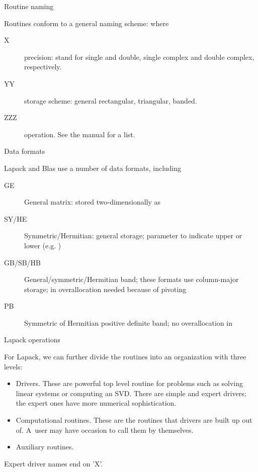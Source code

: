 {Routine naming}

Routines conform to a general naming scheme:  where
\begin{description}
\item[X] precision:  stand for single and double, single
  complex and double complex, respectively.
\item[YY] storage scheme: general rectangular, triangular, banded.
\item[ZZZ] operation. See the manual for a list.
\end{description}

 {Data formats}

Lapack and Blas use a number of data formats, including
\begin{description}
\item[GE] General matrix: stored two-dimensionally as 
\item[SY/HE] Symmetric/Hermitian: general storage;  parameter
  to indicate upper or lower (e.g. )
\item[GB/SB/HB] General/symmetric/Hermitian band; these formats use
  column-major storage; in  overallocation needed because of
  pivoting
\item[PB] Symmetric of Hermitian positive definite band; no
  overallocation in 
\end{description}

 {Lapack operations}

For Lapack, we can further divide the routines into an organization with three levels:
\begin{itemize}
\item Drivers. These are powerful top level routine for problems such
  as solving linear systems or computing an SVD. There are simple and
  expert drivers; the expert ones have more numerical sophistication.
\item Computational routines.
  These are the routines that drivers are built up out of.
  A~user may have occasion to call them by themselves.
\item Auxiliary routines.
\end{itemize}
Expert driver names end on 'X'.

